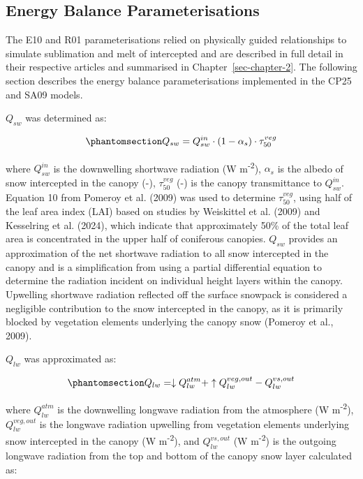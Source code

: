 \documentclass[
  letterpaper,
]{tex/uofsthesis-cs}
\begin{document}
\subsection{Energy Balance
Parameterisations}\label{energy-balance-parameterisations}

The E10 and R01 parameterisations relied on physically guided
relationships to simulate sublimation and melt of intercepted and are
described in full detail in their respective articles and summarised in
Chapter~\ref{sec-chapter-2}. The following section describes the energy
balance parameterisations implemented in the CP25 and SA09 models.

\(Q_{sw}\) was determined as:

\begin{equation}\phantomsection\label{eq-sw}{
Q_{sw} = Q_{sw}^{in} \cdot (1 - \alpha_s) \cdot \tau_{50}^{veg}
}\end{equation}

where \(Q_{sw}^{in}\) is the downwelling shortwave radiation (W
m\textsuperscript{-2}), \(\alpha_s\) is the albedo of snow intercepted
in the canopy (-), \(\tau_{50}^{veg}\) (-) is the canopy transmittance
to \(Q_{sw}^{in}\). Equation 10 from Pomeroy et al. (2009) was used to
determine \(\tau_{50}^{veg}\), using half of the leaf area index (LAI)
based on studies by Weiskittel et al. (2009) and Kesselring et al.
(2024), which indicate that approximately 50\% of the total leaf area is
concentrated in the upper half of coniferous canopies. \(Q_{sw}\)
provides an approximation of the net shortwave radiation to all snow
intercepted in the canopy and is a simplification from using a partial
differential equation to determine the radiation incident on individual
height layers within the canopy. Upwelling shortwave radiation reflected
off the surface snowpack is considered a negligible contribution to the
snow intercepted in the canopy, as it is primarily blocked by vegetation
elements underlying the canopy snow (Pomeroy et al., 2009).

\(Q_{lw}\) was approximated as:

\begin{equation}\phantomsection\label{eq-lw}{
Q_{lw} = \downarrow Q_{lw}^{atm} + \uparrow Q_{lw}^{veg, out} - Q_{lw}^{vs, out}
}\end{equation}

where \(Q_{lw}^{atm}\) is the downwelling longwave radiation from the
atmosphere (W m\textsuperscript{-2}), \(Q_{lw}^{veg, out}\) is the
longwave radiation upwelling from vegetation elements underlying snow
intercepted in the canopy (W m\textsuperscript{-2}), and
\(Q_{lw}^{vs, out}\) (W m\textsuperscript{-2}) is the outgoing longwave
radiation from the top and bottom of the canopy snow layer calculated
as:
\end{document}
